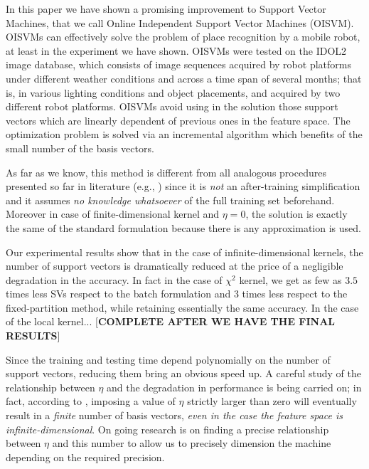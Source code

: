 In this paper we have shown a promising improvement to Support Vector
Machines, that we call Online Independent Support Vector Machines
(OISVM). OISVMs can effectively solve the problem of place recognition
by a mobile robot, at least in the experiment we have shown. OISVMs
were tested on the IDOL2 image database, which consists of image
sequences acquired by robot platforms under different weather
conditions and across a time span of several months; that is, in
various lighting conditions and object placements, and acquired by two
different robot platforms. OISVMs avoid using in the solution those
support vectors which are linearly dependent of previous ones in the
feature space. The optimization problem is solved via an incremental
algorithm which benefits of the small number of the basis vectors.

As far as we know, this method is different from all
analogous procedures presented so far in literature (e.g.,
\cite{DownsGM01,nguyen2005,LeeM01,schoel06,KeerthiCDC06}) since it
is \emph{not} an after-training simplification and it assumes
\emph{no knowledge whatsoever} of the full training set beforehand.
Moreover in case of finite-dimensional kernel and $\eta=0$, the
solution is exactly the same of the standard formulation because
there is any approximation is used.

Our experimental results show that in
the case of infinite-dimensional kernels, the number of support vectors
is dramatically reduced at the price of a negligible degradation in
the accuracy. In fact in the case of $\chi^2$ kernel, we get as few
as $3.5$ times less SVs respect to the batch formulation and $3$
times less respect to the fixed-partition method, while retaining
essentially the same accuracy. In the case of the local kernel...
[\textbf{COMPLETE AFTER WE HAVE THE FINAL RESULTS}]

Since the training and testing time depend polynomially on the
number of support vectors, reducing them bring an obvious speed up. A
careful study of the relationship between $\eta$ and the degradation
in performance is being carried on; in fact, according to
\cite{engel2004}, imposing a value of $\eta$ strictly larger than zero
will eventually result in a \emph{finite} number of basis vectors,
\emph{even in the case the feature space is
infinite-dimensional}. On going research is on finding a precise
relationship between $\eta$ and this number to allow
us to precisely dimension the machine depending on the required
precision.
